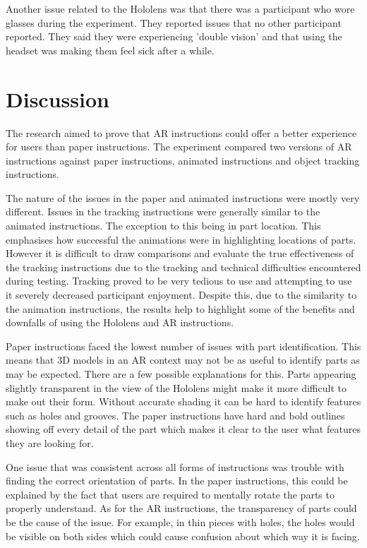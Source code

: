 \documentclass{l4proj}
\begin{document}
Another issue related to the Hololens was that there was a participant who wore glasses during the experiment. They reported issues that no other participant reported. They said they were experiencing 'double vision' and that using the headset was making them feel sick after a while.

\section{Discussion}

The research aimed to prove that AR instructions could offer a better experience for users than paper instructions. The experiment compared two versions of AR instructions against paper instructions, animated instructions and object tracking instructions. 

The nature of the issues in the paper and animated instructions were mostly very different. Issues in the tracking instructions were generally similar to the animated instructions. The exception to this being in part location. This emphasises how successful the animations were in highlighting locations of parts. However it is difficult to draw comparisons and evaluate the true effectiveness of the tracking instructions due to the tracking and technical difficulties encountered during testing. Tracking proved to be very tedious to use and attempting to use it severely decreased participant enjoyment. Despite this, due to the similarity to the animation instructions, the results help to highlight some of the benefits and downfalls of using the Hololens and AR instructions.

Paper instructions faced the lowest number of issues with part identification. This means that 3D models in an AR context may not be as useful to identify parts as may be expected. There are a few possible explanations for this. Parts appearing slightly transparent in the view of the Hololens might make it more difficult to make out their form. Without accurate shading it can be hard to identify features such as holes and grooves. The paper instructions have hard and bold outlines showing off every detail of the part which makes it clear to the user what features they are looking for.

One issue that was consistent across all forms of instructions was trouble with finding the correct orientation of parts. In the paper instructions, this could be explained by the fact that users are required to mentally rotate the parts to properly understand. As for the AR instructions, the transparency of parts could be the cause of the issue. For example, in thin pieces with holes, the holes would be visible on both sides which could cause confusion about which way it is facing. 
\end{document}
